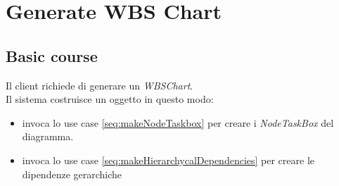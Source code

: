 \section{Generate WBS Chart}
\label{seq:generateWBSChart}

\subsection{Basic course}
Il client richiede di generare un \emph{WBSChart}.\\
Il sistema costruisce un oggetto in questo modo:
\begin{itemize}
  \item invoca lo use case \ref{seq:makeNodeTaskbox} per creare i
  \emph{NodeTaskBox} del diagramma.
  \item invoca lo use case \ref{seq:makeHierarchycalDependencies} per creare le
  dipendenze gerarchiche
\end{itemize}